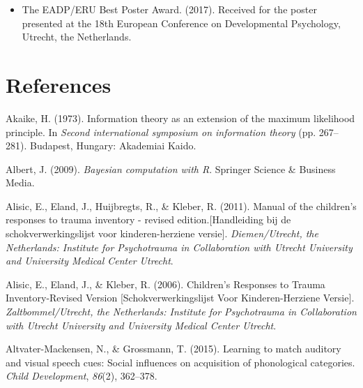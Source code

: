 \documentclass[openright,titlepage,12pt,a4paper]{book}
\providecommand{\tightlist}{%
  \setlength{\itemsep}{0pt}\setlength{\parskip}{0pt}}
\begin{document}
\begin{itemize}
\tightlist
\item
  The EADP/ERU Best Poster Award. (2017). Received for the poster presented at the 18th European Conference on Developmental Psychology, Utrecht, the Netherlands.
\end{itemize}


\hypertarget{ref}{%
\chapter*{References}\label{ref}}

%

\thispagestyle{empty}

\hypertarget{refs}{}
\leavevmode\hypertarget{ref-akaike_information_1973}{}%
Akaike, H. (1973). Information theory as an extension of the maximum likelihood principle. In \emph{Second international symposium on information theory} (pp. 267--281). Budapest, Hungary: Akademiai Kaido.

\leavevmode\hypertarget{ref-albert_bayesian_2009}{}%
Albert, J. (2009). \emph{Bayesian computation with R}. Springer Science \& Business Media.

\leavevmode\hypertarget{ref-alisic_manual_2011}{}%
Alisic, E., Eland, J., Huijbregts, R., \& Kleber, R. (2011). Manual of the children's responses to trauma inventory - revised edition.{[}Handleiding bij de schokverwerkingslijst voor kinderen-herziene versie{]}. \emph{Diemen/Utrecht, the Netherlands: Institute for Psychotrauma in Collaboration with Utrecht University and University Medical Center Utrecht}.

\leavevmode\hypertarget{ref-alisic_childrens_2006}{}%
Alisic, E., Eland, J., \& Kleber, R. (2006). Children's Responses to Trauma Inventory-Revised Version {[}Schokverwerkingslijst Voor Kinderen-Herziene Versie{]}. \emph{Zaltbommel/Utrecht, the Netherlands: Institute for Psychotrauma in Collaboration with Utrecht University and University Medical Center Utrecht}.

\leavevmode\hypertarget{ref-altvater-mackensen_learning_2015}{}%
Altvater-Mackensen, N., \& Grossmann, T. (2015). Learning to match auditory and visual speech cues: Social influences on acquisition of phonological categories. \emph{Child Development}, \emph{86}(2), 362--378.
\end{document}
